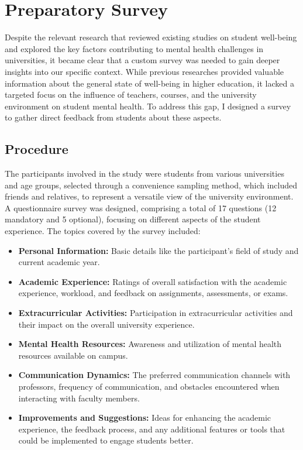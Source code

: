\section{Preparatory Survey}

Despite the relevant research that reviewed existing studies on student well-being and explored the key factors contributing to mental health challenges in universities, it became clear that a custom survey was needed to gain deeper insights into our specific context. While previous researches provided valuable information about the general state of well-being in higher education, it lacked a targeted focus on the influence of teachers, courses, and the university environment on student mental health. To address this gap, I designed a survey to gather direct feedback from students about these aspects.

\subsection{Procedure}

The participants involved in the study were students from various universities and age groups, selected through a convenience sampling method, which included friends and relatives, to represent a versatile view of the university environment. A questionnaire survey was designed, comprising a total of 17 questions (12 mandatory and 5 optional), focusing on different aspects of the student experience. The topics covered by the survey included:

\begin{itemize}
    \item \textbf{Personal Information:} Basic details like the participant’s field of study and current academic year.
    \item \textbf{Academic Experience:} Ratings of overall satisfaction with the academic experience, workload, and feedback on assignments, assessments, or exams.
    \item \textbf{Extracurricular Activities:} Participation in extracurricular activities and their impact on the overall university experience.
    \item \textbf{Mental Health Resources:} Awareness and utilization of mental health resources available on campus.
    \item \textbf{Communication Dynamics:} The preferred communication channels with professors, frequency of communication, and obstacles encountered when interacting with faculty members.
    \item \textbf{Improvements and Suggestions:} Ideas for enhancing the academic experience, the feedback process, and any additional features or tools that could be implemented to engage students better.
\end{itemize}

